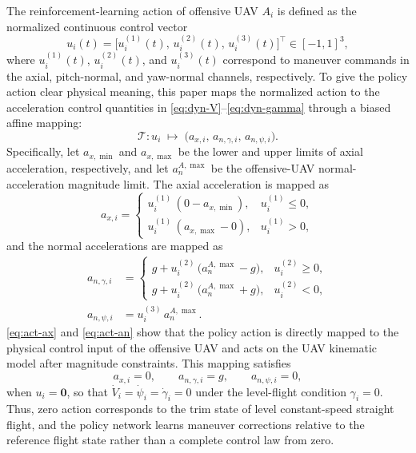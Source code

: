 \documentclass{cja}
\begin{document}
The reinforcement-learning action of offensive UAV $A_i$ is defined as the normalized continuous control vector
\begin{equation}
u_i(t)=\bigl[u_i^{(1)}(t),\,u_i^{(2)}(t),\,u_i^{(3)}(t)\bigr]^{\top}\in[-1,1]^3,
\label{eq:rl-action}
\end{equation}
where $u_i^{(1)}(t)$, $u_i^{(2)}(t)$, and $u_i^{(3)}(t)$ correspond to maneuver commands in the axial, pitch-normal, and yaw-normal channels, respectively. To give the policy action clear physical meaning, this paper maps the normalized action to the acceleration control quantities in \eqref{eq:dyn-V}--\eqref{eq:dyn-gamma} through a biased affine mapping:
\begin{equation}
\mathcal{T}:u_i\;\longmapsto\;\bigl(a_{x,i},\,a_{n,\gamma,i},\,a_{n,\psi,i}\bigr).
\end{equation}
Specifically, let $a_{x,\min}$ and $a_{x,\max}$ be the lower and upper limits of axial acceleration, respectively, and let $a_n^{A,\max}$ be the offensive-UAV normal-acceleration magnitude limit. The axial acceleration is mapped as
\begin{equation}
a_{x,i}=
\begin{cases}
u_i^{(1)}\,(0-a_{x,\min}), & u_i^{(1)}\le 0,\\[2pt]
u_i^{(1)}\,(a_{x,\max}-0), & u_i^{(1)}>0,
\end{cases}
\label{eq:act-ax}
\end{equation}
and the normal accelerations are mapped as
\begin{equation}
\begin{aligned}
a_{n,\gamma,i}
&=
\begin{cases}
g+u_i^{(2)}\,\bigl(a_n^{A,\max}-g\bigr), & u_i^{(2)}\ge 0,\\[2pt]
g+u_i^{(2)}\,\bigl(a_n^{A,\max}+g\bigr), & u_i^{(2)}<0,
\end{cases}
\\
a_{n,\psi,i}
&=u_i^{(3)}\,a_n^{A,\max}.
\end{aligned}
\label{eq:act-an}
\end{equation}
\eqref{eq:act-ax} and \eqref{eq:act-an} show that the policy action is directly mapped to the physical control input of the offensive UAV and acts on the UAV kinematic model after magnitude constraints. This mapping satisfies
\begin{equation}
a_{x,i}=0,\qquad a_{n,\gamma,i}=g,\qquad a_{n,\psi,i}=0,
\end{equation}
when $u_i=\mathbf{0}$, so that $\dot V_i=\dot\psi_i=\dot\gamma_i=0$ under the level-flight condition $\gamma_i=0$. Thus, zero action corresponds to the trim state of level constant-speed straight flight, and the policy network learns maneuver corrections relative to the reference flight state rather than a complete control law from zero.
\end{document}
